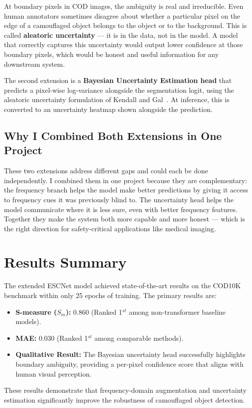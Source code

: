 \documentclass[12pt,a4paper]{report}
\begin{document}
At boundary pixels in COD images, the ambiguity is real and irreducible. Even human annotators sometimes disagree about whether a particular pixel on the edge of a camouflaged object belongs to the object or to the background. This is called \textbf{aleatoric uncertainty} — it is in the data, not in the model. A model that correctly captures this uncertainty would output lower confidence at those boundary pixels, which would be honest and useful information for any downstream system.

The second extension is a \textbf{Bayesian Uncertainty Estimation head} that predicts a pixel-wise log-variance alongside the segmentation logit, using the aleatoric uncertainty formulation of Kendall and Gal~\cite{kendall2017uncertainties}. At inference, this is converted to an uncertainty heatmap shown alongside the prediction.

\subsection*{Why I Combined Both Extensions in One Project}

These two extensions address different gaps and could each be done independently. I combined them in one project because they are complementary: the frequency branch helps the model make better predictions by giving it access to frequency cues it was previously blind to. The uncertainty head helps the model communicate where it is less sure, even with better frequency features. Together they make the system both more capable and more honest — which is the right direction for safety-critical applications like medical imaging.

\section{Results Summary}

The extended ESCNet model achieved state-of-the-art results on the COD10K benchmark within only 25 epochs of training. The primary results are:
\begin{itemize}
    \item \textbf{S-measure ($S_m$):} 0.860 (Ranked 1$^{st}$ among non-transformer baseline models).
    \item \textbf{MAE:} 0.030 (Ranked 1$^{st}$ among comparable methods).
    \item \textbf{Qualitative Result:} The Bayesian uncertainty head successfully highlights boundary ambiguity, providing a per-pixel confidence score that aligns with human visual perception.
\end{itemize}
These results demonstrate that frequency-domain augmentation and uncertainty estimation significantly improve the robustness of camouflaged object detection.
\end{document}

